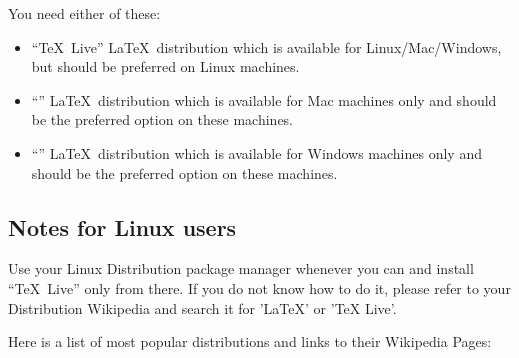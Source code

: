 You need either of these:
\begin{itemize}
    \item ``\TeX\ Live'' \LaTeX\ distribution which is available for
        Linux/Mac/Windows, but should be preferred on Linux machines.
    \item ``\MacTeX'' \LaTeX\ distribution which is available for Mac machines
        only and should be the preferred option on these machines.
    \item ``\MiKTeX'' \LaTeX\ distribution which is available for Windows machines
        only and should be the preferred option on these machines.
\end{itemize}

\subsection{Notes for Linux users}

Use your Linux Distribution package manager whenever you can and install
``\TeX\ Live'' only from there. If you do not know how to do it, please refer to
your Distribution Wikipedia and search it for 'LaTeX' or 'TeX Live'.

Here is a list of most popular distributions and links to their Wikipedia Pages:

